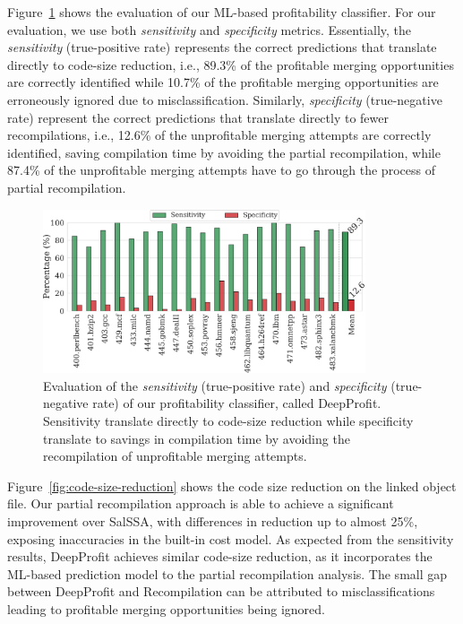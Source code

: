 
Figure~\ref{fig:prediction-ss} shows the evaluation of our ML-based profitability classifier.
For our evaluation, we use both \textit{sensitivity} and \textit{specificity} metrics.
Essentially, the \textit{sensitivity} (true-positive rate) represents the correct predictions that translate directly to code-size reduction, i.e., 89.3\% of the profitable merging opportunities are correctly identified while 10.7\% of the profitable merging opportunities are erroneously ignored due to misclassification.
Similarly, \textit{specificity} (true-negative rate) represent the correct predictions that translate directly to fewer recompilations, i.e., 12.6\% of the unprofitable merging attempts are correctly identified, saving compilation time by avoiding the partial recompilation, while 87.4\% of the unprofitable merging attempts have to go through the process of partial recompilation.

\begin{figure}[h]
  \centering
  \includegraphics[width=0.85\textwidth]{src/deeplearning/figs/prediction-ss.pdf}
  \caption{Evaluation of the \textit{sensitivity} (true-positive rate) and \textit{specificity} (true-negative rate) of our profitability classifier, called DeepProfit. Sensitivity translate directly to code-size reduction while specificity translate to savings in compilation time by avoiding the recompilation of unprofitable merging attempts.
  }
  \label{fig:prediction-ss}
\end{figure}

Figure~\ref{fig:code-size-reduction} shows the code size reduction on the linked object file.
Our partial recompilation approach is able to achieve a significant improvement over SalSSA, with differences in reduction up to almost 25\%, exposing inaccuracies in the built-in cost model.
As expected from the sensitivity results, DeepProfit achieves similar code-size reduction, as it incorporates the ML-based prediction model to the partial recompilation analysis.
The small gap between DeepProfit and Recompilation can be attributed to misclassifications leading to profitable merging opportunities being ignored.

